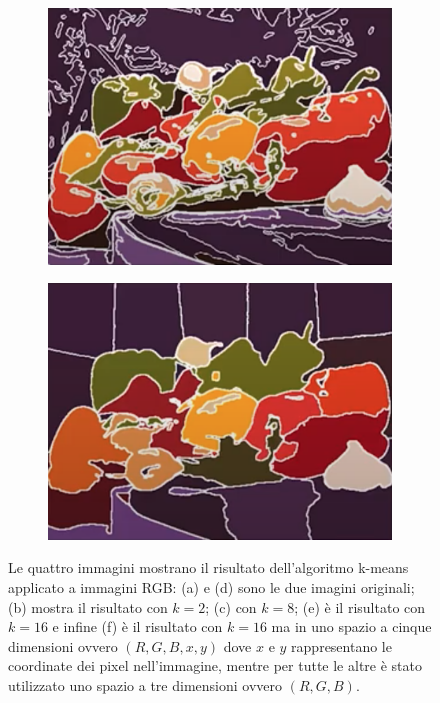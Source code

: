 \begin{figure}[h!]
\begin{subfigure}[b]{0.45\textwidth}
         \caption{}
         \label{}
     \end{subfigure}
     \hfill
     \begin{subfigure}[b]{0.45\textwidth}
         \centering
         \includegraphics[width=\textwidth]{img/frutta_k=16.png}
         \caption{}
         \label{}
     \end{subfigure}
     \hfill
     \begin{subfigure}[b]{0.45\textwidth}
         \centering
         \includegraphics[width=\textwidth]{img/frutta_k=16_xy.png}
         \caption{}
         \label{fig:three sin x}
     \end{subfigure}
        \caption{Le quattro immagini mostrano il risultato dell'algoritmo k-means applicato a immagini RGB: (a) e (d) sono le due imagini originali; (b) mostra il risultato con $k=2$; (c) con $k=8$; (e) è il risultato con $k=16$ e infine (f) è il risultato con $k=16$ ma in uno spazio a cinque dimensioni ovvero $(R,G,B,x,y)$ dove $x$ e $y$ rappresentano le coordinate dei pixel nell'immagine, mentre per tutte le altre è stato utilizzato uno spazio a tre dimensioni ovvero $(R,G,B)$.}
        \label{fig:scimmia_frutta}
\end{figure}






